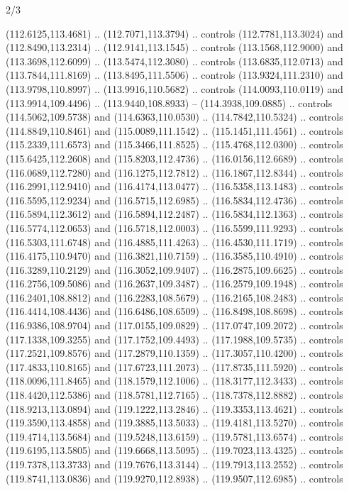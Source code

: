 \begin{flagdescription}{2/3}
\begin{scope}[shift={(0.5\flaglength,0.5)},scale=\flagwidth/320]
\begin{scope}[y=0.8pt, x=0.8pt, yscale=-1,shift={(-118.3,-146)}]
  (112.6125,113.4681) .. (112.7071,113.3794) .. controls (112.7781,113.3024) and
  (112.8490,113.2314) .. (112.9141,113.1545) .. controls (113.1568,112.9000) and
  (113.3698,112.6099) .. (113.5474,112.3080) .. controls (113.6835,112.0713) and
  (113.7844,111.8169) .. (113.8495,111.5506) .. controls (113.9324,111.2310) and
  (113.9798,110.8997) .. (113.9916,110.5682) .. controls (114.0093,110.0119) and
  (113.9914,109.4496) .. (113.9440,108.8933) -- (114.3938,109.0885) .. controls
  (114.5062,109.5738) and (114.6363,110.0530) .. (114.7842,110.5324) .. controls
  (114.8849,110.8461) and (115.0089,111.1542) .. (115.1451,111.4561) .. controls
  (115.2339,111.6573) and (115.3466,111.8525) .. (115.4768,112.0300) .. controls
  (115.6425,112.2608) and (115.8203,112.4736) .. (116.0156,112.6689) .. controls
  (116.0689,112.7280) and (116.1275,112.7812) .. (116.1867,112.8344) .. controls
  (116.2991,112.9410) and (116.4174,113.0477) .. (116.5358,113.1483) .. controls
  (116.5595,112.9234) and (116.5715,112.6985) .. (116.5834,112.4736) .. controls
  (116.5894,112.3612) and (116.5894,112.2487) .. (116.5834,112.1363) .. controls
  (116.5774,112.0653) and (116.5718,112.0003) .. (116.5599,111.9293) .. controls
  (116.5303,111.6748) and (116.4885,111.4263) .. (116.4530,111.1719) .. controls
  (116.4175,110.9470) and (116.3821,110.7159) .. (116.3585,110.4910) .. controls
  (116.3289,110.2129) and (116.3052,109.9407) .. (116.2875,109.6625) .. controls
  (116.2756,109.5086) and (116.2637,109.3487) .. (116.2579,109.1948) .. controls
  (116.2401,108.8812) and (116.2283,108.5679) .. (116.2165,108.2483) .. controls
  (116.4414,108.4436) and (116.6486,108.6509) .. (116.8498,108.8698) .. controls
  (116.9386,108.9704) and (117.0155,109.0829) .. (117.0747,109.2072) .. controls
  (117.1338,109.3255) and (117.1752,109.4493) .. (117.1988,109.5735) .. controls
  (117.2521,109.8576) and (117.2879,110.1359) .. (117.3057,110.4200) .. controls
  (117.4833,110.8165) and (117.6723,111.2073) .. (117.8735,111.5920) .. controls
  (118.0096,111.8465) and (118.1579,112.1006) .. (118.3177,112.3433) .. controls
  (118.4420,112.5386) and (118.5781,112.7165) .. (118.7378,112.8882) .. controls
  (118.9213,113.0894) and (119.1222,113.2846) .. (119.3353,113.4621) .. controls
  (119.3590,113.4858) and (119.3885,113.5033) .. (119.4181,113.5270) .. controls
  (119.4714,113.5684) and (119.5248,113.6159) .. (119.5781,113.6574) .. controls
  (119.6195,113.5805) and (119.6668,113.5095) .. (119.7023,113.4325) .. controls
  (119.7378,113.3733) and (119.7676,113.3144) .. (119.7913,113.2552) .. controls
  (119.8741,113.0836) and (119.9270,112.8938) .. (119.9507,112.6985) .. controls

\end{scope}
\end{scope}
\end{flagdescription}
